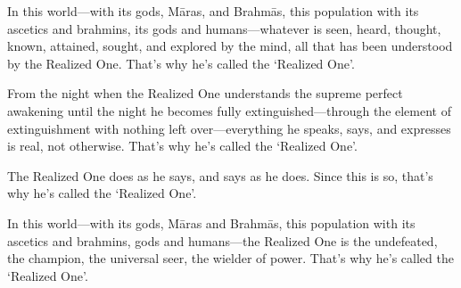 \documentclass[12pt,openany]{book}%
\begin{document}
In this world—with its gods, \textsanskrit{Māras}, and \textsanskrit{Brahmās}, this population with its ascetics and brahmins, its gods and humans—whatever is seen, heard, thought, known, attained, sought, and explored by the mind, all that has been understood by the Realized One. That’s why he’s called the ‘Realized One’. 

From the night when the Realized One understands the supreme perfect awakening until the night he becomes fully extinguished—through the element of extinguishment with nothing left over—everything he speaks, says, and expresses is real, not otherwise. That’s why he’s called the ‘Realized One’. 

The Realized One does as he says, and says as he does. Since this is so, that’s why he’s called the ‘Realized One’. 

In this world—with its gods, \textsanskrit{Māras} and \textsanskrit{Brahmās}, this population with its ascetics and brahmins, gods and humans—the Realized One is the undefeated, the champion, the universal seer, the wielder of power. That’s why he’s called the ‘Realized One’. 
\end{document}
